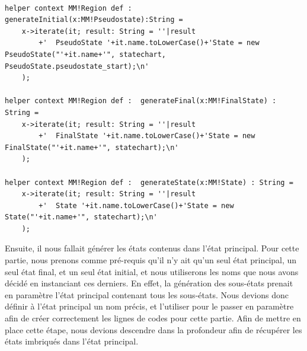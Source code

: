\documentclass[french, 12pt, a4paper]{article}
\begin{document}
        \begin{lstlisting}[caption={Méthodes de génération des lignes de code pour chaque type d'état},basicstyle=\small]
        
helper context MM!Region def : generateInitial(x:MM!Pseudostate):String = 
	x->iterate(it; result: String = ''|result
		+'	PseudoState '+it.name.toLowerCase()+'State = new PseudoState("'+it.name+'", statechart, PseudoState.pseudostate_start);\n'
	);

helper context MM!Region def :  generateFinal(x:MM!FinalState) : String = 
	x->iterate(it; result: String = ''|result
		+'	FinalState '+it.name.toLowerCase()+'State = new FinalState("'+it.name+'", statechart);\n'
	);

helper context MM!Region def :  generateState(x:MM!State) : String = 
	x->iterate(it; result: String = ''|result
		+'	State '+it.name.toLowerCase()+'State = new State("'+it.name+'", statechart);\n'
	);
    \end{lstlisting}
    
    Ensuite, il nous fallait générer les états contenus dans l'état principal. Pour cette partie, nous prenons comme pré-requis qu'il n'y ait qu'un seul état principal, un seul état final, et un seul état initial, et nous utiliserons les noms que nous avons décidé en instanciant ces derniers. En effet, la génération des sous-états prenait en paramètre l'état principal contenant tous les sous-états. Nous devions donc définir à l'état principal un nom précis, et l'utiliser pour le passer en paramètre afin de créer correctement les lignes de codes pour cette partie. Afin de mettre en place cette étape, nous devions descendre dans la profondeur afin de récupérer les états imbriqués dans l'état principal.
    
\end{document}
